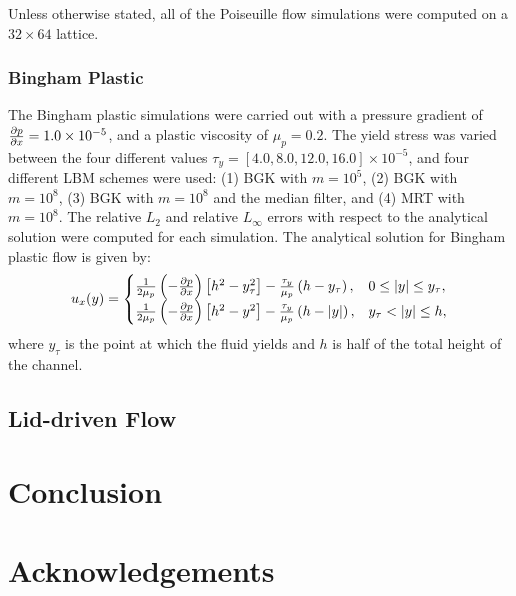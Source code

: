 \documentclass{article}
\begin{document}
Unless otherwise stated, all of the Poiseuille flow simulations were computed on a $32 \times 64$ lattice.

\subsubsection{Bingham Plastic}

The Bingham plastic simulations were carried out with a pressure gradient of $\frac{\partial p}{\partial x} = 1.0 \times 10^{-5}$, and a plastic viscosity of $\mu_p = 0.2$.
The yield stress was varied between the four different values $\tau_y = [4.0, 8.0, 12.0, 16.0] \times 10^{-5}$, and four different LBM schemes were used: (1) BGK with $m = 10^5$, (2) BGK with $m = 10^8$, (3) BGK with $m = 10^8$ and the median filter, and (4) MRT with $m = 10^8$.
The relative $L_2$ and relative $L_{\infty}$ errors with respect to the analytical solution were computed for each simulation.
The analytical solution for Bingham plastic flow is given by:
\begin{equation} \label{eq:analytical-bingham}
u_x(y) = \begin{cases}
\frac{1}{2 \mu_p} \left(-\frac{\partial p}{\partial x}\right) \left[h^2 - y_{\tau}^2 \right] - \frac{\tau_y}{\mu_p} \left(h - y_{\tau}\right), & 0 \leq |y| \leq y_{\tau}, \\
\frac{1}{2 \mu_p} \left(-\frac{\partial p}{\partial x}\right) \left[h^2 - y^2 \right] - \frac{\tau_y}{\mu_p} \left(h - |y|\right), & y_{\tau} < |y| \leq h,
\end{cases}
\end{equation}
\noindent where $y_{\tau}$ is the point at which the fluid yields and $h$ is half of the total height of the channel.

\subsection{Lid-driven Flow}

\section{Conclusion}

\section*{Acknowledgements}



	
\end{document}
